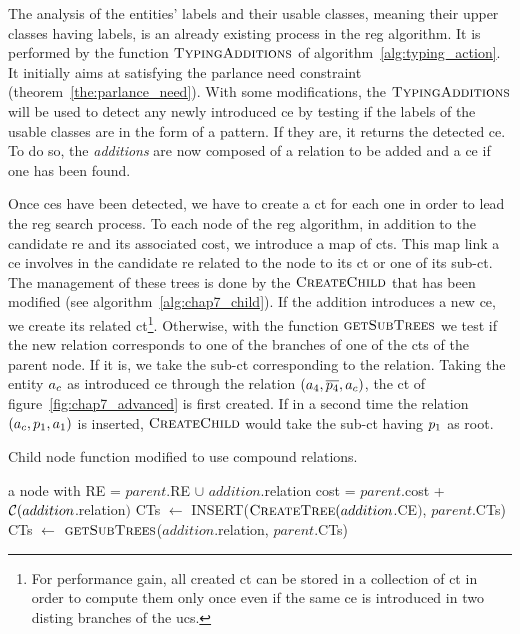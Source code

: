 The analysis of the entities' labels and their usable classes, meaning their upper classes having labels, is an already existing process in the \acrshort{reg} algorithm. It is performed by the function $\textsc{TypingAdditions}$ of algorithm~\ref{alg:typing_action}. It initially aims at satisfying the parlance need constraint (theorem~\ref{the:parlance_need}). With some modifications, the $\textsc{TypingAdditions}$ will be used to detect any newly introduced \acrshort{ce} by testing if the labels of the usable classes are in the form of a pattern. If they are, it returns the detected \acrshort{ce}. To do so, the \textit{additions} are now composed of a relation to be added and a \acrshort{ce} if one has been found.

Once \acrshort{ce}s have been detected, we have to create a \acrfull{ct} for each one in order to lead the \acrshort{reg} search process. To each node of the \acrshort{reg} algorithm, in addition to the candidate \acrshort{re} and its associated cost, we introduce a map of \acrshort{ct}s. This map link a \acrshort{ce} involves in the candidate \acrshort{re} related to the node to its \acrshort{ct} or one of its sub-\acrshort{ct}. The management of these trees is done by the $\textsc{CreateChild}$ that has been modified (see algorithm~\ref{alg:chap7_child}). If the addition introduces a new \acrshort{ce}, we create its related \acrshort{ct}\footnote{For performance gain, all created \acrshort{ct} can be stored in a collection of \acrshort{ct} in order to compute them only once even if the same \acrshort{ce} is introduced in two disting branches of the \acrshort{ucs}.}. Otherwise, with the function $\textsc{getSubTrees}$ we test if the new relation corresponds to one of the branches of one of the \acrshort{ct}s of the parent node. If it is, we take the sub-\acrshort{ct} corresponding to the relation. Taking the entity $a_c$ as introduced \acrshort{ce} through the relation $(a_4, \overline{p_4}, a_c)$, the \acrshort{ct} of figure~\ref{fig:chap7_advanced} is first created. If in a second time the relation $(a_c, p_1, a_1)$ is inserted, $\textsc{CreateChild}$ would take the sub-\acrshort{ct} having $p_1$ as root.

\begin{algorithm}[ht!]
\caption{\label{alg:chap7_child} Child node function modified to use compound relations.}
\begin{algorithmic}
    \State \Return a node with
    \State RE = $parent$.RE $\cup$ $addition$.relation
    \State cost = $parent$.cost + $\mathcal{C}(addition$.relation$)$
    	\State CTs $\leftarrow$ INSERT($\textsc{CreateTree}(addition$.CE$)$, $parent$.CTs)
    \Else
    	\State CTs $\leftarrow$ $\textsc{getSubTrees}$($addition$.relation, $parent$.CTs)
    \EndIf
\EndFunction
\end{algorithmic}
\end{algorithm}

